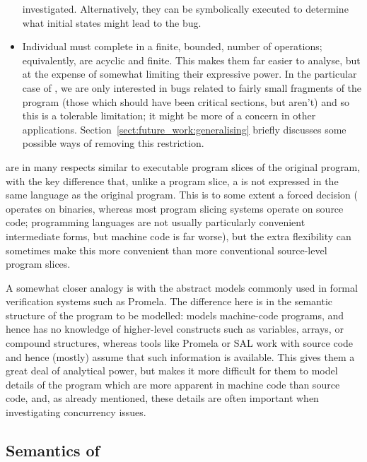 \begin{itemize}
  investigated.  Alternatively, they can be symbolically executed to
  determine what initial states might lead to the bug.
\item
  Individual {\StateMachines} must complete in a finite, bounded,
  number of operations; equivalently, {\StateMachines} are acyclic and
  finite.  This makes them far easier to analyse, but at the expense
  of somewhat limiting their expressive power.  In the particular case
  of {\technique}, we are only interested in bugs related to fairly
  small fragments of the program (those which should have been
  critical sections, but aren't) and so this is a tolerable
  limitation; it might be more of a concern in other applications.
  Section~\ref{sect:future_work:generalising} briefly discusses some
  possible ways of removing this restriction.
\end{itemize}

{\STateMachines} are in many respects similar to executable program
slices of the original program, with the key difference that, unlike a
program slice, a {\StateMachine} is not expressed in the same language
as the original program.  This is to some extent a forced decision
({\technique} operates on binaries, whereas most program slicing
systems operate on source code; programming languages are not usually
particularly convenient intermediate forms, but machine code is far
worse), but the extra flexibility can sometimes make this more
convenient than more conventional source-level program
slices.

A somewhat closer analogy is with the abstract models commonly used in
formal verification systems such as Promela\needCite{}.  The
difference here is in the semantic structure of the program to be
modelled: {\technique} models machine-code programs, and hence has no
knowledge of higher-level constructs such as variables, arrays, or
compound structures, whereas tools like Promela or SAL\needCite{} work
with source code and hence (mostly) assume that such information is
available.  This gives them a great deal of analytical power, but
makes it more difficult for them to model details of the program which
are more apparent in machine code than source code, and, as already
mentioned, these details are often important when investigating
concurrency issues.


\subsection{Semantics of {\StateMachines}}


